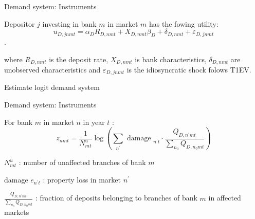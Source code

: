 \documentclass[notes,11pt, aspectratio=169]{beamer}
\newenvironment{wideitemize}{\itemize\addtolength{\itemsep}{10pt}}{\enditemize}
\begin{document}
\begin{frame}{Demand system: Instruments}
    \vspace{0.2cm}

    \item Depositor $j$ investing in bank $m$ in market $m$ has the fowing utility:
    $$u_{D, j n m t}=\alpha_D R_{D, n m t}+X_{D, n m t} \beta_D+\delta_{D, n m t}+\varepsilon_{D, j n m t}$$.

    where $R_{D, n m t}$ is the deposit rate, $X_{D, n m t}$ is bank characteristics, $\delta_{D, n m t}$ are unobserved characteristics and $\varepsilon_{D, j n m t}$ is the idiosyncratic shock folows T1EV. 
    \begin{wideitemize}


        \item Estimate logit demand system \\%

\end{wideitemize}

\end{frame}


\begin{frame}{Demand system: Instruments}
    \vspace{0.2cm}

    \begin{wideitemize}
\item For bank $m$ in market $n$ in year $t$ :
$$
z_{n m t}=\frac{1}{N_{m t}^u} \log \left(\sum_{n^{\prime}} \text { damage }_{n^{\prime} t} \cdot \frac{Q_{D, n^{\prime} m t}}{\sum_{n_0} Q_{D, n_0 m t}}\right)
$$
\item $N_{m t}^u$ : number of unaffected branches of bank $m$
\item damage $e_{n^{\prime} t}$ : property loss in market $n^{\prime}$
\item $\frac{Q_{D, n^{\prime} m t}}{\sum_{n_0} Q_{D, n_0 m t}}$ : fraction of deposits belonging to branches of bank $m$ in affected markets
\end{wideitemize}
\end{frame}
\end{document}
